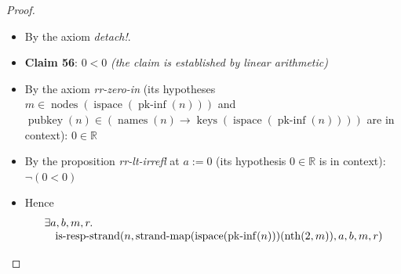 \documentclass[11pt]{article}
\theoremstyle{plain}
\begin{document}
\begin{proof}
\begin{itemize}[leftmargin=2.8em, itemsep=4pt, parsep=1pt]
\begin{itemize}[leftmargin=2.8em, itemsep=4pt, parsep=1pt]
\begin{itemize}[leftmargin=2.8em, itemsep=4pt, parsep=1pt]
  \end{itemize}
  \item[\textbf{400}] By the axiom \emph{detach!}.
  \item[\textbf{401--402}] \textbf{Claim 56}: $0 < 0$  \emph{(the claim is established by linear arithmetic)}
  \item[\textbf{403}] By the axiom \emph{rr-zero-in} (its hypotheses $m \in \operatorname{nodes}(\operatorname{ispace}(\operatorname{pk\text{-}inf}(n)))$ and $\operatorname{pubkey}(n) \in (\operatorname{names}(n) \to \operatorname{keys}(\operatorname{ispace}(\operatorname{pk\text{-}inf}(n))))$ are in context): $0 \in \mathbb{R}$
  \item[\textbf{404}] By the proposition \emph{rr-lt-irrefl} at $a := 0$ (its hypothesis $0 \in \mathbb{R}$ is in context): $\neg (0 < 0)$
  \item[\textbf{405--409}] Hence 
\begin{equation*}
\begin{array}{@{}l@{}}
\begin{array}{@{}l@{}} \exists a, b, m, r. \\ \quad \operatorname{is\text{-}resp\text{-}strand}(n, \operatorname{strand\text{-}map}(\operatorname{ispace}(\operatorname{pk\text{-}inf}(n)))(\operatorname{nth}(2, m)), a, b, m, r) \end{array} \\

\end{array}
\end{equation*}
\end{itemize}
\end{itemize}
\end{proof}
\end{document}
